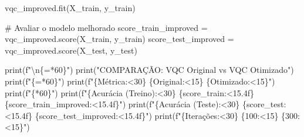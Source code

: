 \documentclass[
  brazilian,
]{report}
\newenvironment{Shaded}{\begin{snugshade}}{\end{snugshade}}
\newcommand{\BuiltInTok}[1]{\textcolor[rgb]{0.00,0.23,0.31}{#1}}
\newcommand{\CharTok}[1]{\textcolor[rgb]{0.13,0.47,0.30}{#1}}
\newcommand{\CommentTok}[1]{\textcolor[rgb]{0.37,0.37,0.37}{#1}}
\newcommand{\DecValTok}[1]{\textcolor[rgb]{0.68,0.00,0.00}{#1}}
\newcommand{\NormalTok}[1]{\textcolor[rgb]{0.00,0.23,0.31}{#1}}
\newcommand{\OperatorTok}[1]{\textcolor[rgb]{0.37,0.37,0.37}{#1}}
\newcommand{\SpecialCharTok}[1]{\textcolor[rgb]{0.37,0.37,0.37}{#1}}
\newcommand{\SpecialStringTok}[1]{\textcolor[rgb]{0.13,0.47,0.30}{#1}}
\newcommand{\StringTok}[1]{\textcolor[rgb]{0.13,0.47,0.30}{#1}}
\begin{document}
\begin{tcolorbox}
\begin{Shaded}
\begin{Highlighting}[]
\NormalTok{vqc\_improved.fit(X\_train, y\_train)}

\CommentTok{\# Avaliar o modelo melhorado}
\NormalTok{score\_train\_improved }\OperatorTok{=}\NormalTok{ vqc\_improved.score(X\_train, y\_train)}
\NormalTok{score\_test\_improved }\OperatorTok{=}\NormalTok{ vqc\_improved.score(X\_test, y\_test)}

\BuiltInTok{print}\NormalTok{(}\SpecialStringTok{f"}\CharTok{\textbackslash{}n}\SpecialCharTok{\{}\StringTok{\textquotesingle{}=\textquotesingle{}}\OperatorTok{*}\DecValTok{60}\SpecialCharTok{\}}\SpecialStringTok{"}\NormalTok{)}
\BuiltInTok{print}\NormalTok{(}\StringTok{"COMPARAÇÃO: VQC Original vs VQC Otimizado"}\NormalTok{)}
\BuiltInTok{print}\NormalTok{(}\SpecialStringTok{f"}\SpecialCharTok{\{}\StringTok{\textquotesingle{}=\textquotesingle{}}\OperatorTok{*}\DecValTok{60}\SpecialCharTok{\}}\SpecialStringTok{"}\NormalTok{)}
\BuiltInTok{print}\NormalTok{(}\SpecialStringTok{f"}\SpecialCharTok{\{}\StringTok{\textquotesingle{}Métrica\textquotesingle{}}\SpecialCharTok{:\textless{}30\}}\SpecialStringTok{ }\SpecialCharTok{\{}\StringTok{\textquotesingle{}Original\textquotesingle{}}\SpecialCharTok{:\textless{}15\}}\SpecialStringTok{ }\SpecialCharTok{\{}\StringTok{\textquotesingle{}Otimizado\textquotesingle{}}\SpecialCharTok{:\textless{}15\}}\SpecialStringTok{"}\NormalTok{)}
\BuiltInTok{print}\NormalTok{(}\SpecialStringTok{f"}\SpecialCharTok{\{}\StringTok{\textquotesingle{}{-}\textquotesingle{}}\OperatorTok{*}\DecValTok{60}\SpecialCharTok{\}}\SpecialStringTok{"}\NormalTok{)}
\BuiltInTok{print}\NormalTok{(}\SpecialStringTok{f"}\SpecialCharTok{\{}\StringTok{\textquotesingle{}Acurácia (Treino)\textquotesingle{}}\SpecialCharTok{:\textless{}30\}}\SpecialStringTok{ }\SpecialCharTok{\{}\NormalTok{score\_train}\SpecialCharTok{:\textless{}15.4f\}}\SpecialStringTok{ }\SpecialCharTok{\{}\NormalTok{score\_train\_improved}\SpecialCharTok{:\textless{}15.4f\}}\SpecialStringTok{"}\NormalTok{)}
\BuiltInTok{print}\NormalTok{(}\SpecialStringTok{f"}\SpecialCharTok{\{}\StringTok{\textquotesingle{}Acurácia (Teste)\textquotesingle{}}\SpecialCharTok{:\textless{}30\}}\SpecialStringTok{ }\SpecialCharTok{\{}\NormalTok{score\_test}\SpecialCharTok{:\textless{}15.4f\}}\SpecialStringTok{ }\SpecialCharTok{\{}\NormalTok{score\_test\_improved}\SpecialCharTok{:\textless{}15.4f\}}\SpecialStringTok{"}\NormalTok{)}
\BuiltInTok{print}\NormalTok{(}\SpecialStringTok{f"}\SpecialCharTok{\{}\StringTok{\textquotesingle{}Iterações\textquotesingle{}}\SpecialCharTok{:\textless{}30\}}\SpecialStringTok{ }\SpecialCharTok{\{}\StringTok{\textquotesingle{}100\textquotesingle{}}\SpecialCharTok{:\textless{}15\}}\SpecialStringTok{ }\SpecialCharTok{\{}\StringTok{\textquotesingle{}300\textquotesingle{}}\SpecialCharTok{:\textless{}15\}}\SpecialStringTok{"}\NormalTok{)}

\end{Highlighting}
\end{Shaded}
\end{tcolorbox}
\end{document}
